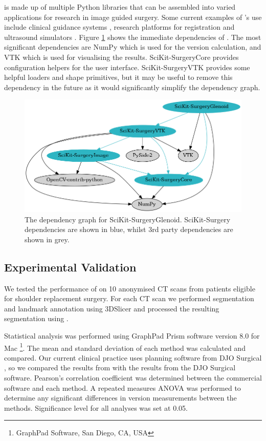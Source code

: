 \sksurgery is made up of multiple Python libraries that can be assembled into
varied applications for research in image guided surgery. Some current examples 
of \sksurgeryns's use include clinical
guidance systems \cite{schneider2020comparison}, research platforms for registration \cite{thompson2021fiducial} and ultrasound simulators \cite{thompson2020snappysonic}.
Figure \ref{fig:deps} shows the immediate dependencies of \sksglenoidns. The most significant dependencies are NumPy\cite{2020NumPy-Array} which is used for the version calculation, and {VTK}\cite{Schroeder:1998:VTO:272980} which is used for visualising the results. SciKit-SurgeryCore provides configuration helpers for the user interface. SciKit-SurgeryVTK provides some helpful loaders and shape primitives, but it may be useful to remove this dependency in the future as it would significantly simplify the dependency graph.

\begin{figure}
        \begin{center}
                \includegraphics[width=0.6\linewidth]{figures/dep_graph.png}
                        \caption{\label{fig:deps}The dependency graph for SciKit-SurgeryGlenoid. SciKit-Surgery dependencies are shown in blue, whilst 3rd party dependencies are shown in grey.}
        \end{center}
\end{figure}

\subsection{Experimental Validation}
We tested the performance of \sksglenoid on 10 anonymised {CT} scans from patients 
eligible for shoulder replacement surgery. For each {CT} scan we performed segmentation 
and landmark annotation using 3DSlicer \cite{Kikinis2014} and processed
the resulting 
segmentation using \sksglenoidns. 

Statistical analysis was performed using GraphPad Prism software version 8.0 for
Mac \footnote{GraphPad Software, San Diego, CA, USA}. The mean and standard deviation of 
each method was calculated and compared. Our current clinical practice uses planning 
software from {DJO} Surgical \cite{djosurgical}, so we compared the results from 
\sksglenoid with the results from the {DJO} Surgical software. 
Pearson’s correlation coefficient was 
determined between the commercial software and each method. 
A repeated measures ANOVA was performed to determine any significant differences
in version measurements between the methods. Significance level for all analyses was set at 0.05.


